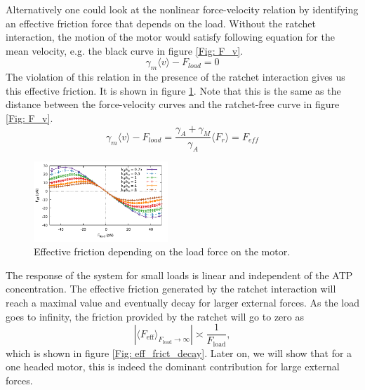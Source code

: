 \documentclass[aps,pre,twocolumn,showpacs,showkeys,a4paper]{revtex4}
\begin{document}
Alternatively one could look at the nonlinear force-velocity relation by identifying an effective friction force that depends on the load. 
Without the ratchet interaction, the motion of the motor would satisfy following equation for the mean velocity, e.g. the black curve in figure \ref{Fig: F_v}.
\begin{equation*}
\gamma_{m}\langle v\rangle - F_{load} = 0
\end{equation*}
The violation of this relation in the presence of the ratchet interaction gives us this effective friction. 
It is shown in figure \ref{Fig: effective_friction}. 
Note that this is the same as the distance between the force-velocity curves and the ratchet-free curve in figure \ref{Fig: F_v}.
\begin{equation*}
\gamma_{m} \langle v \rangle - F_{load} = \frac{\gamma_A + \gamma_M}{\gamma_A} \langle F_r \rangle = F_{eff}
\end{equation*}
\begin{figure}[t]
\centering
\includegraphics[width=0.45\textwidth,height=!]{effective_friction}
\caption{Effective friction depending on the load force on the motor.}
\label{Fig: effective_friction}
\end{figure}
The response of the system for small loads is linear and independent of the ATP concentration. 
The effective friction generated by the ratchet interaction will reach a maximal value and eventually decay for larger external forces. 
As the load goes to infinity, the friction provided by the ratchet will go to zero as 
\begin{equation}
\left| \langle F_\text{eff} \rangle_{F_\text{load}\rightarrow\infty} \right| \asymp \frac{1}{F_\text{load}} , 
\label{eq:eff_vs_load}
\end{equation} 
which is shown in figure \ref{Fig: eff_frict_decay}. 
Later on, we will show that for a one headed motor, this is indeed the dominant contribution for large external forces.  
\end{document}
